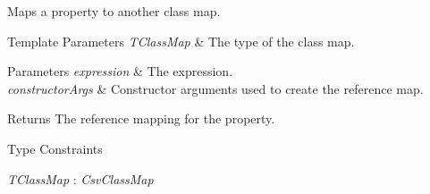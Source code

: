 Maps a property to another class map. 


\begin{DoxyTemplParams}{Template Parameters}
{\em T\-Class\-Map} & The type of the class map.\\
\hline
\end{DoxyTemplParams}

\begin{DoxyParams}{Parameters}
{\em expression} & The expression.\\
\hline
{\em constructor\-Args} & Constructor arguments used to create the reference map.\\
\hline
\end{DoxyParams}
\begin{DoxyReturn}{Returns}
The reference mapping for the property.
\end{DoxyReturn}
\begin{Desc}
\item[Type Constraints]\begin{description}
\item[{\em T\-Class\-Map} : {\em Csv\-Class\-Map}]\end{description}
\end{Desc}


